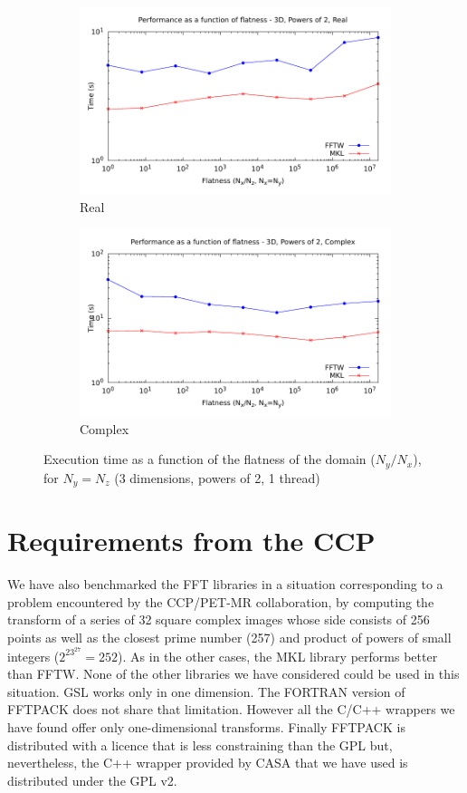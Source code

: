 \documentclass[12pt, a4paper]{article}
\begin{document}
\begin{figure}[H]
\captionsetup{width=0.8\linewidth}
\centering
\begin{subfigure}{.5\textwidth}
\centering
\includegraphics[width=.9\linewidth]{graphs/flatness-r.pdf}
\caption{Real}
\label{FLATNESSR}
\end{subfigure}%
\begin{subfigure}{.5\textwidth}
\centering
\includegraphics[width=.9\linewidth]{graphs/flatness-c.pdf}
\caption{Complex}
\label{FLATNESSC}
\end{subfigure}
\caption{Execution time as a function of the flatness of the domain ($N_y/N_x$), for $N_y=N_z$ (3 dimensions, powers of 2, 1 thread)}
\label{FLATNESS}
\end{figure}


\section{Requirements from the CCP}\label{CCPPETMR}
We have also benchmarked the FFT libraries in a situation corresponding to a problem encountered by the CCP/PET-MR collaboration, by computing the transform of a series of 32 square complex images whose side consists of 256 points as well as the closest prime number (257) and product of powers of small integers ($2^23^27=252$). As in the other cases, the MKL library performs better than FFTW. None of the other libraries we have considered could be used in this situation. GSL works only in one dimension. The FORTRAN version of FFTPACK does not share that limitation. However all the C/C++ wrappers we have found offer only one-dimensional transforms. Finally FFTPACK is distributed with a licence that is less constraining than the GPL but, nevertheless, the C++ wrapper provided by CASA that we have used is distributed under the GPL v2.
\end{document}

